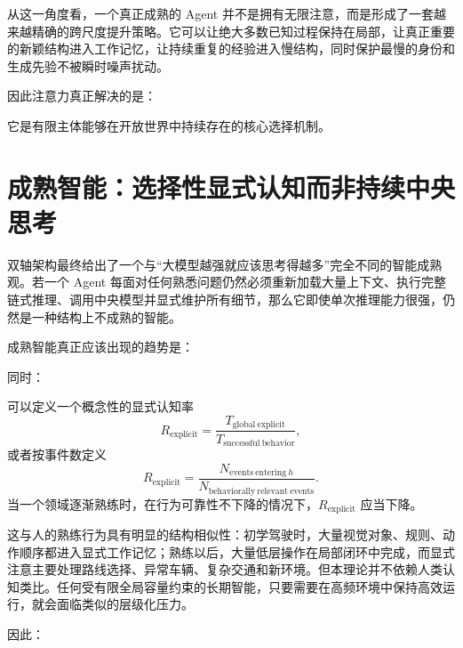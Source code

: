 从这一角度看，一个真正成熟的 Agent 并不是拥有无限注意，而是形成了一套越来越精确的跨尺度提升策略。它可以让绝大多数已知过程保持在局部，让真正重要的新颖结构进入工作记忆，让持续重复的经验进入慢结构，同时保护最慢的身份和生成先验不被瞬时噪声扰动。

因此注意力真正解决的是：
\begin{statementbox}
\centering
{}
\end{statementbox}
它是有限主体能够在开放世界中持续存在的核心选择机制。


\section{成熟智能：选择性显式认知而非持续中央思考}

双轴架构最终给出了一个与“大模型越强就应该思考得越多”完全不同的智能成熟观。若一个 Agent 每面对任何熟悉问题仍然必须重新加载大量上下文、执行完整链式推理、调用中央模型并显式维护所有细节，那么它即使单次推理能力很强，仍然是一种结构上不成熟的智能。

成熟智能真正应该出现的趋势是：
\begin{statementbox}
\centering
{}
\end{statementbox}
同时：
\begin{statementbox}
\centering
{}
\end{statementbox}

可以定义一个概念性的显式认知率
\[
R_{\mathrm{explicit}}
=
\frac{
T_{\mathrm{global\ explicit}}
}{
T_{\mathrm{successful\ behavior}}
},
\]
或者按事件数定义
\[
R_{\mathrm{explicit}}
=
\frac{
N_{\mathrm{events\ entering}\ h}
}{
N_{\mathrm{behaviorally\ relevant\ events}}
}.
\]
当一个领域逐渐熟练时，在行为可靠性不下降的情况下，$R_{\mathrm{explicit}}$ 应当下降。

这与人的熟练行为具有明显的结构相似性：初学驾驶时，大量视觉对象、规则、动作顺序都进入显式工作记忆；熟练以后，大量低层操作在局部闭环中完成，而显式注意主要处理路线选择、异常车辆、复杂交通和新环境。但本理论并不依赖人类认知类比。任何受有限全局容量约束的长期智能，只要需要在高频环境中保持高效运行，就会面临类似的层级化压力。

因此：
\begin{statementbox}
\centering
{}
\end{statementbox}

